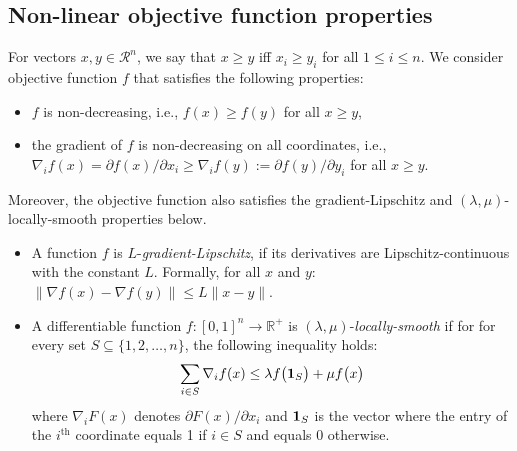 \subsection{Non-linear objective function properties} \label{sec:f-properties}

For vectors $x, y \in \mathcal{R}^{n}$, we say that $x \geq y$ iff $x_{i} \geq y_{i}$ for all $1 \leq i \leq n$.
We consider objective function $f$ that satisfies the following properties:
\begin{itemize}
	\item $f$ is non-decreasing, i.e., $f(x) \geq f(y)$ for all $x \geq y$,
	\item the gradient of $f$ is non-decreasing on all coordinates, i.e., $\nabla_{i} f(x) = \partial f(x)/\partial x_{i} \geq \nabla_{i} f(y) := \partial f(y)/\partial y_{i}$ for all $x \geq y$.
\end{itemize}
%
Moreover, the objective function also satisfies the gradient-Lipschitz and $(\lambda,\mu)$-locally-smooth properties below.
\begin{itemize}
	\item A function $f$ is $L$-\emph{gradient-Lipschitz}, if its derivatives are Lipschitz-continuous with the constant $L$.
		Formally, for all $x$ and $y$: $\|\nabla f(x) - \nabla f(y)\| \le L \|x - y\|$.
	\item A differentiable function $f: [0,1]^{n} \rightarrow \mathbb{R}^{+}$ is $(\lambda,\mu)$-\emph{locally-smooth}
   		 if for  for every set $S \subseteq \{1, 2, \ldots, n\}$, the following inequality holds:
    \begin{equation*}	\label{eq:min-local-smooth}
    \sum_{i \in S} \nabla_{i} f(x) \leq \lambda f\bigl( \mathbf{1}_{S} \bigr) + \mu f\bigl( x \bigr)
    \end{equation*}
    where $\nabla_{i} F(x)$ denotes $\partial F(x)/\partial x_{i}$ and $\mathbf{1}_{S}$ is the vector where the entry of the $i^{\text{th}}$ coordinate equals 1 if $i \in S$
    and equals 0 otherwise.
\end{itemize}

